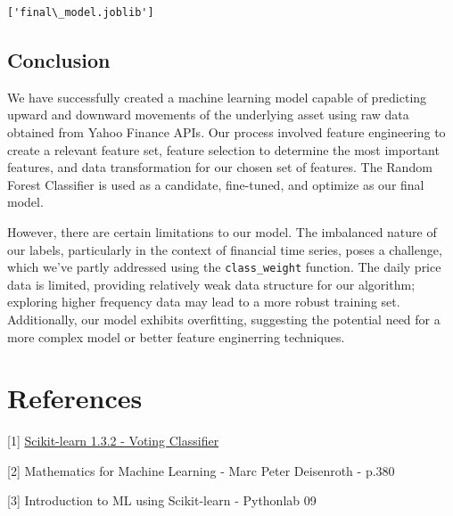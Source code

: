 \documentclass[11pt]{article}
\makeatletter
\newcommand{\boxspacing}{\kern\kvtcb@left@rule\kern\kvtcb@boxsep}
\newcommand{\prompt}[4]{
        {\ttfamily\llap{{\color{#2}[#3]:\hspace{3pt}#4}}\vspace{-\baselineskip}}
    }
\makeatother
\begin{document}
            \begin{tcolorbox}[breakable, size=fbox, boxrule=.5pt, pad at break*=1mm, opacityfill=0]
\prompt{Out}{outcolor}{58}{\boxspacing}
\begin{Verbatim}[commandchars=\\\{\}]
['final\_model.joblib']
\end{Verbatim}
\end{tcolorbox}

\pagebreak        
    \hypertarget{conclusion}{%
\subsection{Conclusion}\label{conclusion}}

We have successfully created a machine learning model capable of predicting upward and downward movements of the underlying asset using raw data obtained from Yahoo Finance APIs. Our process involved feature engineering to create a relevant feature set, feature selection to determine the most important features, and data transformation for our chosen set of features. The Random Forest Classifier is used as a candidate, fine-tuned, and optimize as our final model.

However, there are certain limitations to our model. The imbalanced nature of our labels, particularly in the context of financial time series, poses a challenge, which we've partly addressed using the \texttt{class\_weight} function. The daily price data is limited, providing relatively weak data structure for our algorithm; exploring higher frequency data may lead to a more robust training set. Additionally, our model exhibits overfitting, suggesting the potential need for a more complex model or better feature enginerring techniques.

    \hypertarget{references}{%
\section{References}\label{references}}

    {[}1{]}
\href{https://scikit-learn.org/stable/modules/generated/sklearn.ensemble.VotingClassifier.html}{Scikit-learn
1.3.2 - Voting Classifier}

{[}2{]} Mathematics for Machine Learning - Marc Peter Deisenroth - p.380

{[}3{]} Introduction to ML using Scikit-learn - Pythonlab 09


    
    
    
\end{document}
